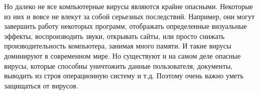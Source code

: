     Но далеко не все компьютерные вирусы являются крайне опасными. Некоторые из них и вовсе не влекут за собой серьезных последствий. Например, они могут завершить работу некоторых программ, отображать определенные визуальные эффекты, воспроизводить звуки, открывать сайты, или просто снижать производительность компьютера, занимая много памяти. И такие вирусы доминируют в современном мире. Но существуют и на самом деле опасные вирусы, которые способны уничтожить данные пользователя, документы, выводить из строя операционную систему и т.д. Поэтому очень важно уметь защищаться от вирусов.


    